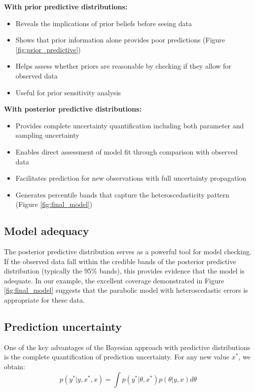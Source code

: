\textbf{With prior predictive distributions:}
\begin{itemize}
\item Reveals the implications of prior beliefs before seeing data
\item Shows that prior information alone provides poor predictions (Figure \ref{fig:prior_predictive})
\item Helps assess whether priors are reasonable by checking if they allow for observed data
\item Useful for prior sensitivity analysis
\end{itemize}

\textbf{With posterior predictive distributions:}
\begin{itemize}
\item Provides complete uncertainty quantification including both parameter and sampling uncertainty
\item Enables direct assessment of model fit through comparison with observed data
\item Facilitates prediction for new observations with full uncertainty propagation
\item Generates percentile bands that capture the heteroscedasticity pattern (Figure \ref{fig:final_model})
\end{itemize}

\subsection{Model adequacy}

The posterior predictive distribution serves as a powerful tool for model checking. If the observed data fall within the credible bands of the posterior predictive distribution (typically the 95\% bands), this provides evidence that the model is adequate. In our example, the excellent coverage demonstrated in Figure \ref{fig:final_model} suggests that the parabolic model with heteroscedastic errors is appropriate for these data.

\subsection{Prediction uncertainty}

One of the key advantages of the Bayesian approach with predictive distributions is the complete quantification of prediction uncertainty. For any new value $x^*$, we obtain:
\begin{equation}
p(y^* | y, x^*, x) = \int p(y^* | \theta, x^*) p(\theta | y, x) d\theta
\end{equation}

